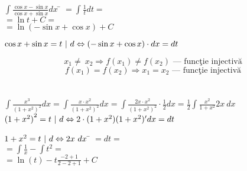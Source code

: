 \documentclass[a4paper, 12pt, notitlepage]{book}
\begin{document}
   \section{}
   \begin{tabbing}
     $\int \frac{\cos x - \sin x}{\cos x + \sin x} dx$ \= $= \int \frac{1}{t}dt =$\\[2pt]
     \> $= \ln t + C =$\\[2pt]
     \> $= \ln (-\sin x + \cos x) + C$
   \end{tabbing}
   $\cos x + \sin x = t\ \arrowvert\ d \Leftrightarrow (-\sin x + \cos x) \cdot dx = dt$

   \[ x_{1} \ne \ x_{2} \Rightarrow f(x_{1}) \ne f(x_{2}) \text{ --- func\c{t}ie injectiv\u{a}}\]
   \[ f(x_{1}) = f(x_{2}) \Rightarrow x_{1} = x_{2} \text{ --- func\c{t}ie injectiv\u{a}}\]

   \section{}
   $\int \frac{x^{3}}{{(1+x^{2})}^{2}}dx = \int \frac{x \cdot x^{2}}{{(1+x^{2})}^{2}}dx = \int \frac{2x \cdot x^{2}}{{(1+x^{2})}^{2}} \cdot \frac{1}{2} dx = \frac{1}{2} \int \frac{x^{2}}{1+x^{2}}2x\ dx$\\[5pt]
   ${(1+x^{2})}^{2} = t\ \arrowvert\ d \Leftrightarrow 2 \cdot (1+x^{2})(1+x^{2})'dx=dt$\\[5pt]
   \begin{tabbing}
     $1+x^{2} = t\ \arrowvert\ d \Leftrightarrow 2x\ dx$ \= $= dt =$\\[2pt]
                                                        \> $= \int \frac{1}{x} - \int t^{2} =$\\[2pt]
                                                        \> $= \ln (t) - t \frac{-2+1}{2-2+1} + C$
   \end{tabbing}
\end{document}
